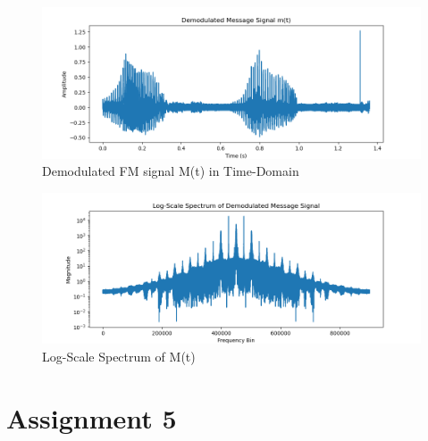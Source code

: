 \documentclass[
	letterpaper, %
	10pt, %
]{CSUniSchoolLabReport}
\begin{document}
\begin{figure}[H] %
	\centering %
	\includegraphics[width=1.2\textwidth]{assignment4a.png} %
	\caption{Demodulated FM signal M(t) in Time-Domain}
	\label{fig:block}
\end{figure}

\begin{figure}[H] %
	\centering %
	\includegraphics[width=1.2\textwidth]{assignment4b.png} %
	\caption{Log-Scale Spectrum of M(t)}
	\label{fig:block}
\end{figure}

\section{Assignment 5}
\end{document}

